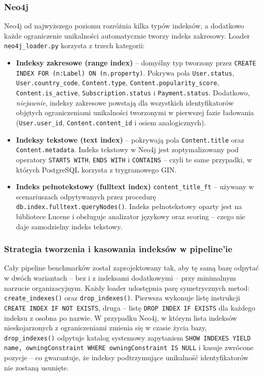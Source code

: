 \subsubsection*{Neo4j}

Neo4j od najwyższego poziomu rozróżnia kilka typów indeksów,
a dodatkowo każde ograniczenie unikalności automatycznie tworzy
indeks zakresowy. Loader \texttt{neo4j\_loader.py} korzysta
z trzech kategorii:

\begin{itemize}
    \item \textbf{Indeksy zakresowe (range index)} -- domyślny
    typ tworzony przez \texttt{CREATE INDEX FOR (n:Label)
    ON (n.property)}. Pokrywa pola \texttt{User.status},
    \texttt{User.country\_code}, \texttt{Content.type},
    \texttt{Content.popularity\_score}, \texttt{Content.is\_active},
    \texttt{Subscription.status} i \texttt{Payment.status}.
    Dodatkowo, \emph{niejawnie}, indeksy zakresowe powstają
    dla wszystkich identyfikatorów objętych ograniczeniami
    unikalności tworzonymi w pierwszej fazie ładowania
    (\texttt{User.user\_id}, \texttt{Content.content\_id}
    i osiem analogicznych).
    \item \textbf{Indeksy tekstowe (text index)} -- pokrywają
    pola \texttt{Content.title} oraz \texttt{Content.metadata}.
    Indeks tekstowy w Neo4j jest zoptymalizowany pod operatory
    \texttt{STARTS WITH}, \texttt{ENDS WITH} i \texttt{CONTAINS}
    -- czyli te same przypadki, w których PostgreSQL korzysta
    z trygramowego GIN.
    \item \textbf{Indeks pełnotekstowy (fulltext index)}
    \texttt{content\_title\_ft} -- używany w scenariuszach
    odpytywanych przez procedurę \texttt{db.index.fulltext.queryNodes()}.
    Indeks pełnotekstowy oparty jest na bibliotece Lucene
    i obsługuje analizator językowy oraz scoring -- czego nie
    daje samodzielny indeks tekstowy.
\end{itemize}

\subsubsection*{Strategia tworzenia i kasowania indeksów w pipeline'ie}

Cały pipeline benchmarków został zaprojektowany tak, aby tę samą
bazę odpytać w dwóch wariantach -- bez i z indeksami dodatkowymi --
przy minimalnym narzucie organizacyjnym. Każdy loader udostępnia
parę symetrycznych metod: \texttt{create\_indexes()} oraz
\texttt{drop\_indexes()}. Pierwsza wykonuje listę instrukcji
\texttt{CREATE INDEX IF NOT EXISTS}, druga -- listę
\texttt{DROP INDEX IF EXISTS} dla każdego indeksu z osobna
po nazwie. W przypadku Neo4j, w którym lista indeksów
nieskojarzonych z ograniczeniami zmienia się w czasie życia
bazy, \texttt{drop\_indexes()} odpytuje katalog systemowy
zapytaniem \texttt{SHOW INDEXES YIELD name, owningConstraint
WHERE owningConstraint IS NULL} i kasuje zwrócone pozycje --
co gwarantuje, że indeksy podtrzymujące unikalność identyfikatorów
nie zostaną usunięte.

